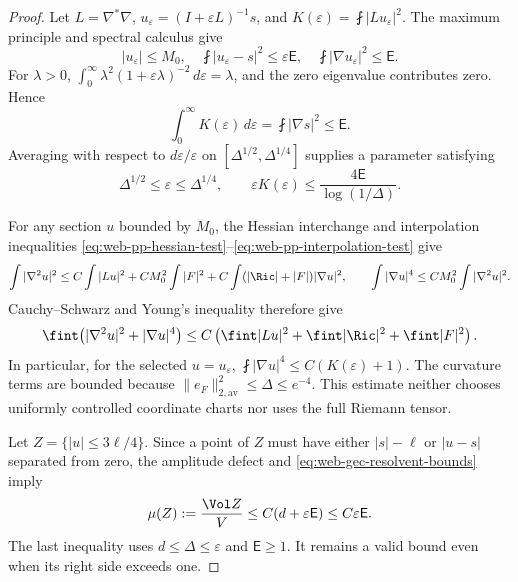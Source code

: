 \begin{proof}
Let \(L=\nabla^*\nabla\),
\(u_\varepsilon=(I+\varepsilon L)^{-1}s\), and
\(K(\varepsilon)=\fint|Lu_\varepsilon|^2\).  The maximum principle
and spectral calculus give
\begin{equation}
 |u_\varepsilon|\le M_0,\quad
 \fint|u_\varepsilon-s|^2\le\varepsilon\mathsf E,\quad
 \fint|\nabla u_\varepsilon|^2\le\mathsf E.
 \label{eq:web-gec-resolvent-bounds}
\end{equation}
For \(\lambda>0\),
\(\int_0^\infty\lambda^2(1+\varepsilon\lambda)^{-2}
\,d\varepsilon=\lambda\), and the zero eigenvalue contributes zero.
Hence
\[
 \int_0^\infty K(\varepsilon)\,d\varepsilon
       =\fint|\nabla s|^2\le\mathsf E.
\]
Averaging with respect to \(d\varepsilon/\varepsilon\) on
\([\Delta^{1/2},\Delta^{1/4}]\) supplies a parameter satisfying
\begin{equation}
 \Delta^{1/2}\le\varepsilon\le\Delta^{1/4},\qquad
 \varepsilon K(\varepsilon)\le
              \frac{4\mathsf E}{\log(1/\Delta)}.
 \label{eq:web-gec-parameter}
\end{equation}

For any section \(u\) bounded by \(M_0\), the Hessian interchange and
interpolation inequalities
\eqref{eq:web-pp-hessian-test}--\eqref{eq:web-pp-interpolation-test} give
\[
 \int|\nabla^2u|^2\le C\int|Lu|^2+CM_0^2\int|F|^2
             +C\int(|\Ric|+|F|)|\nabla u|^2,
 \qquad
 \int|\nabla u|^4\le CM_0^2\int|\nabla^2u|^2.
\]
Cauchy--Schwarz and Young's inequality therefore give
\begin{equation}
 \fint\bigl(|\nabla^2u|^2+|\nabla u|^4\bigr)
 \le C\left(\fint|Lu|^2+\fint|\Ric|^2+\fint|F|^2\right).
 \label{eq:web-gec-hessian}
\end{equation}
In particular, for the selected \(u=u_\varepsilon\),
\(\fint|\nabla u|^4\le C(K(\varepsilon)+1)\).  The curvature
terms are bounded because \(\|e_F\|_{2,\mathrm{av}}^2\le\Delta\le e^{-4}\).
This estimate neither chooses uniformly controlled coordinate charts nor
uses the full Riemann tensor.

Let \(Z=\{|u|\le3\ell/4\}\).  Since a point of \(Z\) must have
either \(|s|-\ell\) or \(|u-s|\) separated from zero, the amplitude
defect and \eqref{eq:web-gec-resolvent-bounds} imply
\begin{equation}
 \mu(Z):=\frac{\Vol Z}{V}
 \le C(d+\varepsilon\mathsf E)\le C\varepsilon\mathsf E.
 \label{eq:web-gec-low-set}
\end{equation}
The last inequality uses \(d\le\Delta\le\varepsilon\) and
\(\mathsf E\ge1\).  It remains a valid bound even when its right side
exceeds one.


\end{proof}

